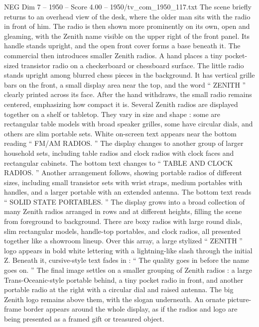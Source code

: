 \begin{textsample}{NEG Dim 7 – 1950 – Score 4.00 – 1950/tv\_com\_1950\_117.txt}
The scene briefly returns to an overhead view of the desk, where the older man sits with the radio in front of him.
The radio is then shown more prominently on its own, open and gleaming, with the Zenith name visible on the upper right of the front panel.
Its handle stands upright, and the open front cover forms a base beneath it.
The commercial then introduces smaller Zenith radios.
A hand places a tiny pocket-sized transistor radio on a checkerboard or chessboard surface.
The little radio stands upright among blurred chess pieces in the background.
It has vertical grille bars on the front, a small display area near the top, and the word “ ZENITH ” clearly printed across its face.
After the hand withdraws, the small radio remains centered, emphasizing how compact it is.
Several Zenith radios are displayed together on a shelf or tabletop.
They vary in size and shape : some are rectangular table models with broad speaker grilles, some have circular dials, and others are slim portable sets.
White on-screen text appears near the bottom reading “ FM/AM RADIOS. ” The display changes to another group of larger household sets, including table radios and clock radios with clock faces and rectangular cabinets.
The bottom text changes to “ TABLE AND CLOCK RADIOS. ” Another arrangement follows, showing portable radios of different sizes, including small transistor sets with wrist straps, medium portables with handles, and a larger portable with an extended antenna.
The bottom text reads “ SOLID STATE PORTABLES. ” The display grows into a broad collection of many Zenith radios arranged in rows and at different heights, filling the scene from foreground to background.
There are boxy radios with large round dials, slim rectangular models, handle-top portables, and clock radios, all presented together like a showroom lineup.
Over this array, a large stylized “ ZENITH ” logo appears in bold white lettering with a lightning-like slash through the initial Z.
Beneath it, cursive-style text fades in : “ The quality goes in before the name goes on. ” The final image settles on a smaller grouping of Zenith radios : a large Trans-Oceanic-style portable behind, a tiny pocket radio in front, and another portable radio at the right with a circular dial and raised antenna.
The big Zenith logo remains above them, with the slogan underneath.
An ornate picture-frame border appears around the whole display, as if the radios and logo are being presented as a framed gift or treasured object.

\end{textsample}
